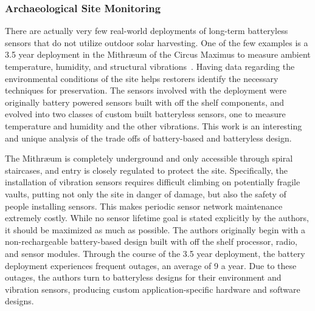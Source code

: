 \subsubsection{Archaeological Site Monitoring}
There are actually very few real-world deployments of long-term batteryless sensors that do not utilize outdoor solar harvesting.
One of the few examples is a 3.5 year deployment in the Mithræum of the Circus Maximus to measure ambient temperature, humidity, and structural vibrations~\cite{afanasov2020battery}. 
Having data regarding the environmental conditions of the site helps restorers identify the necessary techniques for preservation.
The sensors involved with the deployment were originally battery powered sensors built with off the shelf components, and evolved into two classes of custom built batteryless sensors, one to measure temperature and humidity and the other vibrations.
This work is an interesting and unique analysis of the trade offs of battery-based and batteryless design.

The Mithræum is completely underground and only accessible through spiral staircases, and entry is closely regulated to protect the site. 
Specifically, the installation of vibration sensors requires difficult climbing on potentially fragile vaults, putting not only the site in danger of damage, but also the safety of people installing sensors. 
This makes periodic sensor network maintenance extremely costly.
While no sensor lifetime goal is stated explicitly by the authors, it should be maximized as much as possible. 
The authors originally begin with a non-rechargeable battery-based design built with off the shelf processor, radio, and sensor modules.
Through the course of the 3.5 year deployment, the battery deployment experiences frequent outages, an average of 9 a year. 
Due to these outages, the authors turn to batteryless designs for their environment and vibration sensors, producing custom application-specific hardware and software designs.

